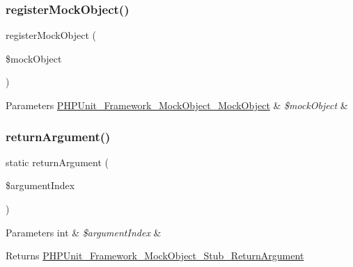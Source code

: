\subsubsection{\texorpdfstring{register\+Mock\+Object()}{registerMockObject()}}
{\footnotesize\ttfamily register\+Mock\+Object (\begin{DoxyParamCaption}\item[{\mbox{\hyperlink{interface_p_h_p_unit___framework___mock_object___mock_object}{P\+H\+P\+Unit\+\_\+\+Framework\+\_\+\+Mock\+Object\+\_\+\+Mock\+Object}}}]{\$mock\+Object }\end{DoxyParamCaption})}


\begin{DoxyParams}[1]{Parameters}
\mbox{\hyperlink{interface_p_h_p_unit___framework___mock_object___mock_object}{P\+H\+P\+Unit\+\_\+\+Framework\+\_\+\+Mock\+Object\+\_\+\+Mock\+Object}} & {\em \$mock\+Object} & \\
\hline
\end{DoxyParams}
\mbox{\label{class_p_h_p_unit___framework___test_case_a8c6fc29a4fa7ac8606712d11a76f00c3}} 
\subsubsection{\texorpdfstring{return\+Argument()}{returnArgument()}}
{\footnotesize\ttfamily static return\+Argument (\begin{DoxyParamCaption}\item[{}]{\$argument\+Index }\end{DoxyParamCaption})\hspace{0.3cm}{\ttfamily [static]}}


\begin{DoxyParams}[1]{Parameters}
int & {\em \$argument\+Index} & \\
\hline
\end{DoxyParams}
\begin{DoxyReturn}{Returns}
\mbox{\hyperlink{class_p_h_p_unit___framework___mock_object___stub___return_argument}{P\+H\+P\+Unit\+\_\+\+Framework\+\_\+\+Mock\+Object\+\_\+\+Stub\+\_\+\+Return\+Argument}} 
\end{DoxyReturn}
\mbox{\label{class_p_h_p_unit___framework___test_case_ac10127c2bf64242fb66a6d53fa94723b}} 

